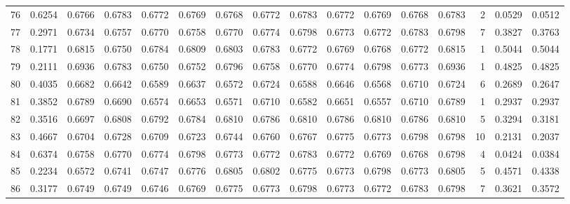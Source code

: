 \begin{tabular}{lrrrrrrrrrrrrrrr}
76  &      0.6254 &  0.6766 &  0.6783 &  0.6772 &  0.6769 &  0.6768 &  0.6772 &  0.6783 &  0.6772 &  0.6769 &   0.6768 &     0.6783 &      2 &                    0.0529 &                     0.0512 \\
77  &      0.2971 &  0.6734 &  0.6757 &  0.6770 &  0.6758 &  0.6770 &  0.6774 &  0.6798 &  0.6773 &  0.6772 &   0.6783 &     0.6798 &      7 &                    0.3827 &                     0.3763 \\
78  &      0.1771 &  0.6815 &  0.6750 &  0.6784 &  0.6809 &  0.6803 &  0.6783 &  0.6772 &  0.6769 &  0.6768 &   0.6772 &     0.6815 &      1 &                    0.5044 &                     0.5044 \\
79  &      0.2111 &  0.6936 &  0.6783 &  0.6750 &  0.6752 &  0.6796 &  0.6758 &  0.6770 &  0.6774 &  0.6798 &   0.6773 &     0.6936 &      1 &                    0.4825 &                     0.4825 \\
80  &      0.4035 &  0.6682 &  0.6642 &  0.6589 &  0.6637 &  0.6572 &  0.6724 &  0.6588 &  0.6646 &  0.6568 &   0.6710 &     0.6724 &      6 &                    0.2689 &                     0.2647 \\
81  &      0.3852 &  0.6789 &  0.6690 &  0.6574 &  0.6653 &  0.6571 &  0.6710 &  0.6582 &  0.6651 &  0.6557 &   0.6710 &     0.6789 &      1 &                    0.2937 &                     0.2937 \\
82  &      0.3516 &  0.6697 &  0.6808 &  0.6792 &  0.6784 &  0.6810 &  0.6786 &  0.6810 &  0.6786 &  0.6810 &   0.6786 &     0.6810 &      5 &                    0.3294 &                     0.3181 \\
83  &      0.4667 &  0.6704 &  0.6728 &  0.6709 &  0.6723 &  0.6744 &  0.6760 &  0.6767 &  0.6775 &  0.6773 &   0.6798 &     0.6798 &     10 &                    0.2131 &                     0.2037 \\
84  &      0.6374 &  0.6758 &  0.6770 &  0.6774 &  0.6798 &  0.6773 &  0.6772 &  0.6783 &  0.6772 &  0.6769 &   0.6768 &     0.6798 &      4 &                    0.0424 &                     0.0384 \\
85  &      0.2234 &  0.6572 &  0.6741 &  0.6747 &  0.6776 &  0.6805 &  0.6802 &  0.6775 &  0.6773 &  0.6798 &   0.6773 &     0.6805 &      5 &                    0.4571 &                     0.4338 \\
86  &      0.3177 &  0.6749 &  0.6749 &  0.6746 &  0.6769 &  0.6775 &  0.6773 &  0.6798 &  0.6773 &  0.6772 &   0.6783 &     0.6798 &      7 &                    0.3621 &                     0.3572 \\

\end{tabular}

